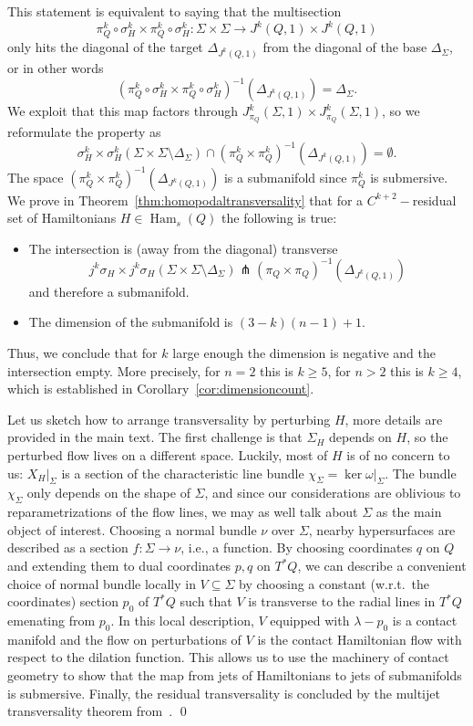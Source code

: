 \documentclass{amsart}
\newcommand{\Ham}{\operatorname{Ham}}
\theoremstyle{definition}
\theoremstyle{remark}
\numberwithin{equation}{section}
\begin{document}
This statement is equivalent to saying that the multisection $$\pi_Q^k\circ\sigma_H^k\times \pi_Q^k\circ\sigma_H^k \colon\Sigma\times\Sigma\to J^k(Q,1)\times J^k(Q,1)$$
only hits the diagonal of the target $\Delta_{J^k(Q,1)}$ from the diagonal of the base $\Delta_\Sigma$, or in other words 
$$(\pi_Q^k\circ\sigma_H^k\times \pi_Q^k\circ\sigma_H^k)^{-1}(\Delta_{J^k(Q,1)})=\Delta_\Sigma.$$
We exploit that this map factors through $J^k_{\pi_Q}(\Sigma,1)\times J^k_{\pi_Q}(\Sigma,1)$, so we reformulate the property as
$$\sigma_H^k\times \sigma_H^k (\Sigma\times \Sigma \setminus\Delta_\Sigma) \cap (\pi_Q^k\times\pi_Q^k)^{-1}(\Delta_{J^k(Q,1)}) =\emptyset.$$
The space $(\pi_Q^k\times\pi_Q^k)^{-1}(\Delta_{J^k(Q,1)})$ is a submanifold since $\pi_Q^k$ is submersive. 
We prove in Theorem~\ref{thm:homopodaltransversality} that for a $C^{k+2}-$residual set of Hamiltonians $H\in\Ham_s(Q)$ the following is true:
\begin{itemize}
    \item The intersection is (away from the diagonal) transverse 
        $$j^k\sigma_H\times j^k\sigma_H (\Sigma\times \Sigma\setminus\Delta_\Sigma) \pitchfork (\pi_Q\times\pi_Q)^{-1}(\Delta_{J^k(Q,1)})$$
        and therefore a submanifold.
    \item The dimension of the submanifold is $(3-k)(n-1)+1.$ 
\end{itemize}
Thus, we conclude that for $k$ large enough the dimension is negative and the intersection empty. More precisely, for $n=2$ this is $k\geq 5$, for $n>2$ this is $k\geq 4$, which is established in Corollary~\ref{cor:dimensioncount}.

Let us sketch how to arrange transversality by perturbing $H$, more details are provided in the main text. The first challenge is that $\Sigma_H$ depends on $H$, so the perturbed flow lives on a different space. Luckily, most of $H$ is of no concern to us: $X_H|_\Sigma$ is a section of the characteristic line bundle $\chi_\Sigma = \ker\omega|_\Sigma$. The bundle $\chi_\Sigma$ only depends on the shape of $\Sigma$, and since our considerations are oblivious to reparametrizations of the flow lines, we may as well talk about $\Sigma$ as the main object of interest. Choosing a normal bundle $\nu$ over $\Sigma$, nearby hypersurfaces are described as a section $f:\Sigma\to \nu$, i.e., a function. By choosing coordinates $q$ on $Q$ and extending them to dual coordinates $p,q$ on $T^*Q$, we can describe a convenient choice of normal bundle locally in $V\subseteq\Sigma$ by choosing a constant (w.r.t.\ the coordinates) section $p_0$ of $T^*Q$ such that $V$ is transverse to the radial lines in $T^*Q$ emenating from $p_0$. In this local description, $V$ equipped with $\lambda-p_0$ is a contact manifold and the flow on perturbations of $V$ is the contact Hamiltonian flow with respect to the dilation function. This allows us to use the machinery of contact geometry to show that the map from jets of Hamiltonians to jets of submanifolds is submersive. Finally, the residual transversality is concluded by the multijet transversality theorem from~\cite{G25}. 
\qed
\end{document}
